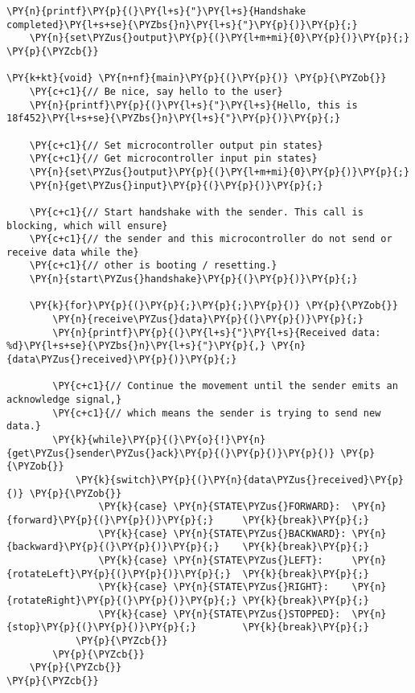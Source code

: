 \begin{Verbatim}[commandchars=\\\{\}]
    \PY{n}{printf}\PY{p}{(}\PY{l+s}{"}\PY{l+s}{Handshake completed}\PY{l+s+se}{\PYZbs{}n}\PY{l+s}{"}\PY{p}{)}\PY{p}{;}
    \PY{n}{set\PYZus{}output}\PY{p}{(}\PY{l+m+mi}{0}\PY{p}{)}\PY{p}{;}
\PY{p}{\PYZcb{}}

\PY{k+kt}{void} \PY{n+nf}{main}\PY{p}{(}\PY{p}{)} \PY{p}{\PYZob{}}
    \PY{c+c1}{// Be nice, say hello to the user}
    \PY{n}{printf}\PY{p}{(}\PY{l+s}{"}\PY{l+s}{Hello, this is 18f452}\PY{l+s+se}{\PYZbs{}n}\PY{l+s}{"}\PY{p}{)}\PY{p}{;}

    \PY{c+c1}{// Set microcontroller output pin states}
    \PY{c+c1}{// Get microcontroller input pin states}
    \PY{n}{set\PYZus{}output}\PY{p}{(}\PY{l+m+mi}{0}\PY{p}{)}\PY{p}{;}
    \PY{n}{get\PYZus{}input}\PY{p}{(}\PY{p}{)}\PY{p}{;}

    \PY{c+c1}{// Start handshake with the sender. This call is blocking, which will ensure}
    \PY{c+c1}{// the sender and this microcontroller do not send or receive data while the}
    \PY{c+c1}{// other is booting / resetting.}
    \PY{n}{start\PYZus{}handshake}\PY{p}{(}\PY{p}{)}\PY{p}{;}

    \PY{k}{for}\PY{p}{(}\PY{p}{;}\PY{p}{;}\PY{p}{)} \PY{p}{\PYZob{}}
        \PY{n}{receive\PYZus{}data}\PY{p}{(}\PY{p}{)}\PY{p}{;}
        \PY{n}{printf}\PY{p}{(}\PY{l+s}{"}\PY{l+s}{Received data: %d}\PY{l+s+se}{\PYZbs{}n}\PY{l+s}{"}\PY{p}{,} \PY{n}{data\PYZus{}received}\PY{p}{)}\PY{p}{;}

        \PY{c+c1}{// Continue the movement until the sender emits an acknowledge signal,}
        \PY{c+c1}{// which means the sender is trying to send new data.}
        \PY{k}{while}\PY{p}{(}\PY{o}{!}\PY{n}{get\PYZus{}sender\PYZus{}ack}\PY{p}{(}\PY{p}{)}\PY{p}{)} \PY{p}{\PYZob{}}
            \PY{k}{switch}\PY{p}{(}\PY{n}{data\PYZus{}received}\PY{p}{)} \PY{p}{\PYZob{}}
                \PY{k}{case} \PY{n}{STATE\PYZus{}FORWARD}:  \PY{n}{forward}\PY{p}{(}\PY{p}{)}\PY{p}{;}     \PY{k}{break}\PY{p}{;}
                \PY{k}{case} \PY{n}{STATE\PYZus{}BACKWARD}: \PY{n}{backward}\PY{p}{(}\PY{p}{)}\PY{p}{;}    \PY{k}{break}\PY{p}{;}
                \PY{k}{case} \PY{n}{STATE\PYZus{}LEFT}:     \PY{n}{rotateLeft}\PY{p}{(}\PY{p}{)}\PY{p}{;}  \PY{k}{break}\PY{p}{;}
                \PY{k}{case} \PY{n}{STATE\PYZus{}RIGHT}:    \PY{n}{rotateRight}\PY{p}{(}\PY{p}{)}\PY{p}{;} \PY{k}{break}\PY{p}{;}
                \PY{k}{case} \PY{n}{STATE\PYZus{}STOPPED}:  \PY{n}{stop}\PY{p}{(}\PY{p}{)}\PY{p}{;}        \PY{k}{break}\PY{p}{;}
            \PY{p}{\PYZcb{}}
        \PY{p}{\PYZcb{}}
    \PY{p}{\PYZcb{}}
\PY{p}{\PYZcb{}}
\end{Verbatim}
